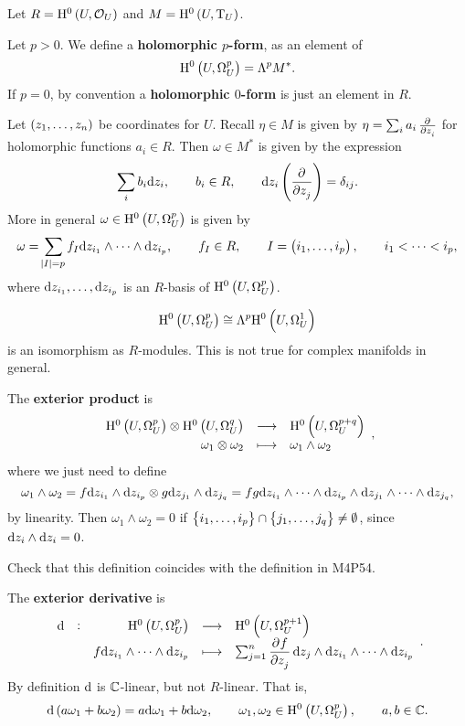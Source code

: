Let $ R = \H^0\br{U, \OOO_U} $ and $ M = \H^0\br{U, \T_U} $.

\begin{definition}
Let $ p > 0 $. We define a \textbf{holomorphic $ p $-form}, as an element of
$$ \H^0\br{U, \Omega_U^p} = \Lambda^pM^*. $$
If $ p = 0 $, by convention a \textbf{holomorphic $ 0 $-form} is just an element in $ R $.
\end{definition}

Let $ \br{z_1, \dots, z_n} $ be coordinates for $ U $. Recall $ \eta \in M $ is given by $ \eta = \sum_i a_i\tpd{}{z_i} $ for holomorphic functions $ a_i \in R $. Then $ \omega \in M^* $ is given by the expression
$$ \sum_i b_i \d z_i, \qquad b_i \in R, \qquad \d z_i\br{\dpd{}{z_j}} = \delta_{ij}. $$
More in general $ \omega \in \H^0\br{U, \Omega_U^p} $ is given by
$$ \omega = \sum_{\abs{I} = p} f_I \d z_{i_1} \wedge \dots \wedge \d z_{i_p}, \qquad f_I \in R, \qquad I = \br{i_1, \dots, i_p}, \qquad i_1 < \dots < i_p, $$
where $ \mathrm{d} z_{i_1}, \dots, \mathrm{d} z_{i_p} $ is an $ R $-basis of $ \H^0\br{U, \Omega_U^p} $.

\begin{example*}
$$ \H^0\br{U, \Omega_U^p} \cong \Lambda^p\H^0\br{U, \Omega_U^1} $$
is an isomorphism as $ R $-modules. This is not true for complex manifolds in general.
\end{example*}

The \textbf{exterior product} is
$$ \function{\H^0\br{U, \Omega_U^p} \otimes \H^0\br{U, \Omega_U^q}}{\H^0\br{U, \Omega_U^{p + q}}}{\omega_1 \otimes \omega_2}{\omega_1 \wedge \omega_2}, $$
where we just need to define
$$ \omega_1 \wedge \omega_2 = f \mathrm{d} z_{i_1} \wedge \mathrm{d} z_{i_p} \otimes g \mathrm{d} z_{j_1} \wedge \mathrm{d} z_{j_q} = fg \mathrm{d} z_{i_1} \wedge \dots \wedge \mathrm{d} z_{i_p} \wedge \mathrm{d} z_{j_1} \wedge \dots \wedge \mathrm{d} z_{j_q}, $$
by linearity. Then $ \omega_1 \wedge \omega_2 = 0 $ if $ \cbr{i_1, \dots, i_p} \cap \cbr{j_1, \dots, j_q} \ne \emptyset $, since $ \mathrm{d} z_i \wedge \mathrm{d} z_i = 0 $.

\begin{exercise*}
Check that this definition coincides with the definition in M4P54.
\end{exercise*}

The \textbf{exterior derivative} is
$$ \function[\d]{\H^0\br{U, \Omega_U^p}}{\H^0\br{U, \Omega_U^{p + 1}}}{f \d z_{i_1} \wedge \dots \wedge \d z_{i_p}}{\sum_{j = 1}^n \dpd{f}{z_j} \d z_j \wedge \d z_{i_1} \wedge \dots \wedge \d z_{i_p}}. $$
By definition $ \mathrm{d} $ is $ \mathbb{C} $-linear, but not $ R $-linear. That is,
$$ \d\br{a\omega_1 + b\omega_2} = a \d\omega_1 + b \d\omega_2, \qquad \omega_1, \omega_2 \in \H^0\br{U, \Omega_U^p}, \qquad a, b \in \CC. $$

